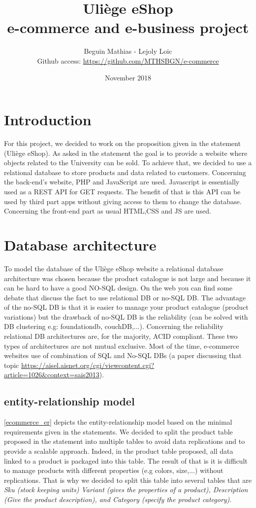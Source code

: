\documentclass{article}
\title{Uliège eShop \\e-commerce and e-business project}
\author{Beguin Mathias - Lejoly Loic \\ Github access: \url{https://github.com/MTHSBGN/e-commerce}}
\date{November 2018}
\begin{document}
\maketitle
\newpage

\section{Introduction}
For this project, we decided to work on the proposition given in the statement (Uliège eShop). As asked in the statement the goal is to provide a website where objects related to the University can be sold. To achieve that, we decided to use a relational database to store products and data related to customers. Concerning the back-end's website, PHP and JavaScript are used. Javascript is essentially used as a REST API for GET requests. The benefit of that is this API can be used by third part apps without giving access to them to change the database. Concerning the front-end part as usual HTML,CSS and JS are used.

\section{Database architecture}
To model the database of the Uliège eShop website a relational database architecture was chosen because the product catalogue is not large and because it can be hard to have a good NO-SQL design. On the web you can find some debate that discuss the fact to use relational DB or no-SQL DB. The advantage of the no-SQL DB is that it is easier to manage your product catalogue (product variations) but the drawback of no-SQL DB is the reliability (can be solved with DB clustering e.g: foundationdb, couchDB,...). Concerning the reliability relational DB architectures are, for the majority, ACID compliant. These two types of architectures are not mutual exclusive. Most of the time, e-commerce websites use of combination of SQL and No-SQL DBs (a paper discussing that topic \url{https://aisel.aisnet.org/cgi/viewcontent.cgi?article=1026&context=sais2013}).

\subsection{entity-relationship model}
\autoref{ecommerce_er} depicts the entity-relationship model based on the minimal requirements given in the statements. We decided to split the product table proposed in the statement into multiple tables to avoid data replications and to provide a scalable approach. Indeed, in the product table proposed, all data linked to a product is packaged into this table. The result of that is it is difficult to manage products with different properties (e.g colors, size,...) without replications. That is why we decided to split this table into several tables that are \textit{Sku (stock keeping units) Variant (gives the properties of a product), Description (Give the product description), and Category (specify the product category)}. \\
\end{document}

